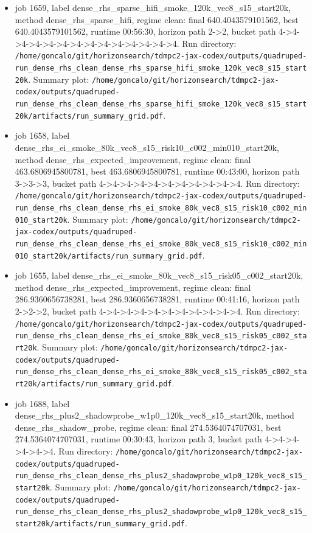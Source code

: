 \begin{itemize}
\item job 1659, label dense\_rhs\_sparse\_hifi\_smoke\_120k\_vec8\_s15\_start20k, method dense\_rhs\_sparse\_hifi, regime clean: final 640.4043579101562, best 640.4043579101562, runtime 00:56:30, horizon path 2->2, bucket path 4->4->4->4->4->4->4->4->4->4->4->4->4->4. Run directory: \texttt{/home/goncalo/git/horizonsearch/tdmpc2-jax-codex/outputs/quadruped-run\_dense\_rhs\_clean\_dense\_rhs\_sparse\_hifi\_smoke\_120k\_vec8\_s15\_start20k}. Summary plot: \texttt{/home/goncalo/git/horizonsearch/tdmpc2-jax-codex/outputs/quadruped-run\_dense\_rhs\_clean\_dense\_rhs\_sparse\_hifi\_smoke\_120k\_vec8\_s15\_start20k/artifacts/run\_summary\_grid.pdf}.
\item job 1658, label dense\_rhs\_ei\_smoke\_80k\_vec8\_s15\_risk10\_c002\_min010\_start20k, method dense\_rhs\_expected\_improvement, regime clean: final 463.6806945800781, best 463.6806945800781, runtime 00:43:00, horizon path 3->3->3, bucket path 4->4->4->4->4->4->4->4->4->4->4. Run directory: \texttt{/home/goncalo/git/horizonsearch/tdmpc2-jax-codex/outputs/quadruped-run\_dense\_rhs\_clean\_dense\_rhs\_ei\_smoke\_80k\_vec8\_s15\_risk10\_c002\_min010\_start20k}. Summary plot: \texttt{/home/goncalo/git/horizonsearch/tdmpc2-jax-codex/outputs/quadruped-run\_dense\_rhs\_clean\_dense\_rhs\_ei\_smoke\_80k\_vec8\_s15\_risk10\_c002\_min010\_start20k/artifacts/run\_summary\_grid.pdf}.
\item job 1655, label dense\_rhs\_ei\_smoke\_80k\_vec8\_s15\_risk05\_c002\_start20k, method dense\_rhs\_expected\_improvement, regime clean: final 286.9360656738281, best 286.9360656738281, runtime 00:41:16, horizon path 2->2->2, bucket path 4->4->4->4->4->4->4->4->4->4->4. Run directory: \texttt{/home/goncalo/git/horizonsearch/tdmpc2-jax-codex/outputs/quadruped-run\_dense\_rhs\_clean\_dense\_rhs\_ei\_smoke\_80k\_vec8\_s15\_risk05\_c002\_start20k}. Summary plot: \texttt{/home/goncalo/git/horizonsearch/tdmpc2-jax-codex/outputs/quadruped-run\_dense\_rhs\_clean\_dense\_rhs\_ei\_smoke\_80k\_vec8\_s15\_risk05\_c002\_start20k/artifacts/run\_summary\_grid.pdf}.
\item job 1688, label dense\_rhs\_plus2\_shadowprobe\_w1p0\_120k\_vec8\_s15\_start20k, method dense\_rhs\_shadow\_probe, regime clean: final 274.5364074707031, best 274.5364074707031, runtime 00:30:43, horizon path 3, bucket path 4->4->4->4->4->4. Run directory: \texttt{/home/goncalo/git/horizonsearch/tdmpc2-jax-codex/outputs/quadruped-run\_dense\_rhs\_clean\_dense\_rhs\_plus2\_shadowprobe\_w1p0\_120k\_vec8\_s15\_start20k}. Summary plot: \texttt{/home/goncalo/git/horizonsearch/tdmpc2-jax-codex/outputs/quadruped-run\_dense\_rhs\_clean\_dense\_rhs\_plus2\_shadowprobe\_w1p0\_120k\_vec8\_s15\_start20k/artifacts/run\_summary\_grid.pdf}.

\end{itemize}
